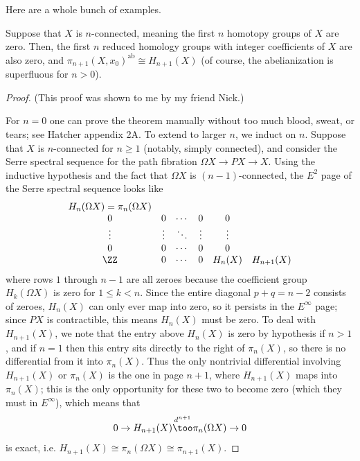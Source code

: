 \documentclass[10pt]{article}
\begin{document}
Here are a whole bunch of examples.

\begin{theorem}
    \label{thm:hurewicz}
    Suppose that $X$ is $n$-connected,
    meaning the first $n$ homotopy groups of $X$ are zero.
    Then, the first $n$ reduced homology groups with integer coefficients
    of $X$ are also zero, and
    $\pi_{n+1}(X,x_0)^{\mathrm{ab}}\cong H_{n+1}(X)$
    (of course, the abelianization is superfluous for $n>0$).
\end{theorem}

\begin{proof}
    (This proof was shown to me by my friend Nick.)

    For $n = 0$ one can prove the theorem manually without
    too much blood, sweat, or tears;
    see Hatcher appendix 2A. To extend to larger $n$, we induct on $n$.
    Suppose that $X$ is $n$-connected for $n\ge 1$
    (notably, simply connected), and consider
    the Serre spectral sequence for the path fibration
    $\Omega X\to PX\to X$. Using the inductive hypothesis
    and the fact that $\Omega X$ is $(n-1)$-connected,
    the $E^2$ page of the Serre spectral sequence looks like
    \begin{equation*}
        \begin{matrix}
            H_n(\Omega X) = \pi_n(\Omega X)\\
	    0 & 0 & \cdots & 0 & 0\\
	    \vdots & \vdots & \ddots & \vdots & \vdots\\
	    0 & 0 & \cdots & 0 & 0\\
	    \ZZ & 0 &\cdots& 0 & H_n(X) & H_{n+1}(X)
        \end{matrix}
    \end{equation*}
    where rows $1$ through $n-1$ are all zeroes
    because the coefficient group $H_k(\Omega X)$ is zero for $1\le k < n$.
    Since the entire diagonal $p+q=n-2$ consists of zeroes,
    $H_n(X)$ can only ever map into zero,
    so it persists in the $E^\infty$ page;
    since $PX$ is contractible, this means $H_n(X)$ must be zero.
    To deal with $H_{n+1}(X)$, we note that
    the entry above $H_n(X)$ is zero by hypothesis if $n > 1$,
    and if $n = 1$ then this entry sits directly to the right of $\pi_n(X)$,
    so there is no differential from it into $\pi_n(X)$.
    Thus the only nontrivial differential involving
    $H_{n+1}(X)$ or $\pi_n(X)$ is the one in page $n+1$,
    where $H_{n+1}(X)$ maps into $\pi_n(X)$;
    this is the only opportunity for these two to become zero
    (which they must in $E^\infty$), which means that
    \begin{equation*}
	0\to H_{n+1}(X) \overset{d^{n+1}}\too \pi_n(\Omega X)\to 0
    \end{equation*}
    is exact, i.e. $H_{n+1}(X)\cong \pi_n(\Omega X) \cong \pi_{n+1}(X)$.
\end{proof}
\end{document}
